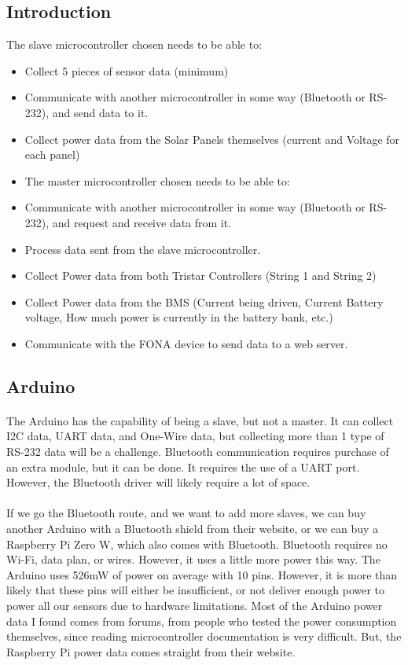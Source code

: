 \subsection{Introduction}

The slave microcontroller chosen needs to be able to:
\begin{itemize}
	\item Collect 5 pieces of sensor data (minimum)
	\item Communicate with another microcontroller in some way (Bluetooth or RS-232), and send data to it.
	\item Collect power data from the Solar Panels themselves (current and Voltage for each panel)
	\item The master microcontroller chosen needs to be able to:
	\item Communicate with another microcontroller in some way (Bluetooth or RS-232), and request and receive data from it.
	\item Process data sent from the slave microcontroller.
	\item Collect Power data from both Tristar Controllers (String 1 and String 2)
	\item Collect Power data from the BMS (Current being driven, Current Battery voltage, How much power is currently in the battery bank, etc.)
	\item Communicate with the FONA device to send data to a web server.
\end{itemize}

 
\subsection{Arduino}
\paragraph{}
The Arduino has the capability of being a slave, but not a master. It can collect I2C data, UART data, and One-Wire data, but collecting more than 1 type of RS-232 data will be a challenge. Bluetooth communication requires purchase of an extra module, but it can be done. It requires the use of a UART port. However, the Bluetooth driver will likely require a lot of space.  
\paragraph{}
If we go the Bluetooth route, and we want to add more slaves, we can buy another Arduino with a Bluetooth shield from their website, or we can buy a Raspberry Pi Zero W, which also comes with Bluetooth. Bluetooth requires no Wi-Fi, data plan, or wires. However, it uses a little more power this way. The Arduino uses 526mW of power on average with 10 pins. However, it is more than likely that these pins will either be insufficient, or not deliver enough power to power all our sensors due to hardware limitations. Most of the Arduino power data I found comes from forums, from people who tested the power consumption themselves, since reading microcontroller documentation is very difficult. But, the Raspberry Pi power data comes straight from their website.
 

